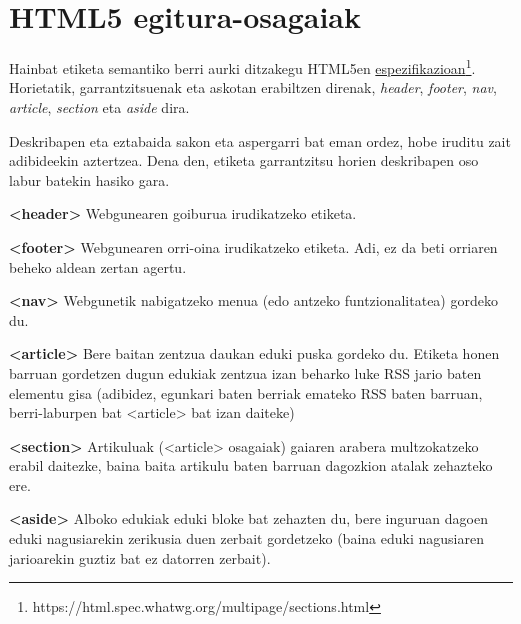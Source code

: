 \chapter{HTML5 egitura-osagaiak}

Hainbat etiketa semantiko berri aurki ditzakegu HTML5en  \href{https://html.spec.whatwg.org/multipage/sections.html}{espezifikazioan}\footnote{https://html.spec.whatwg.org/multipage/sections.html}. Horietatik, garrantzitsuenak eta askotan erabiltzen direnak, \textit{header}, \textit{footer}, \textit{nav}, \mbox{\textit{article}}, \textit{section} eta \textit{aside} dira.

Deskribapen eta eztabaida sakon eta aspergarri bat eman ordez, hobe iruditu zait adibideekin aztertzea. Dena den, etiketa garrantzitsu horien deskribapen oso labur batekin hasiko gara.


\textbf{<header>} Webgunearen goiburua irudikatzeko etiketa. 

\textbf{<footer>} Webgunearen orri-oina irudikatzeko etiketa. Adi, ez da beti orriaren beheko aldean zertan agertu. 

\textbf{<nav>} Webgunetik nabigatzeko menua (edo antzeko funtzionalitatea) gordeko du.

\textbf{<article>} Bere baitan zentzua daukan eduki puska gordeko du. Etiketa honen barruan gordetzen dugun edukiak zentzua izan beharko luke RSS jario baten elementu gisa (adibidez, egunkari baten berriak emateko RSS baten barruan, berri-laburpen bat <article> bat izan daiteke)

\textbf{<section>} Artikuluak (<article> osagaiak) gaiaren arabera multzokatzeko erabil daitezke, baina baita artikulu baten barruan dagozkion atalak zehazteko ere.

\textbf{<aside>} Alboko edukiak eduki bloke bat zehazten du, bere inguruan dagoen eduki nagusiarekin zerikusia duen zerbait gordetzeko (baina eduki nagusiaren jarioarekin guztiz bat ez datorren zerbait).


